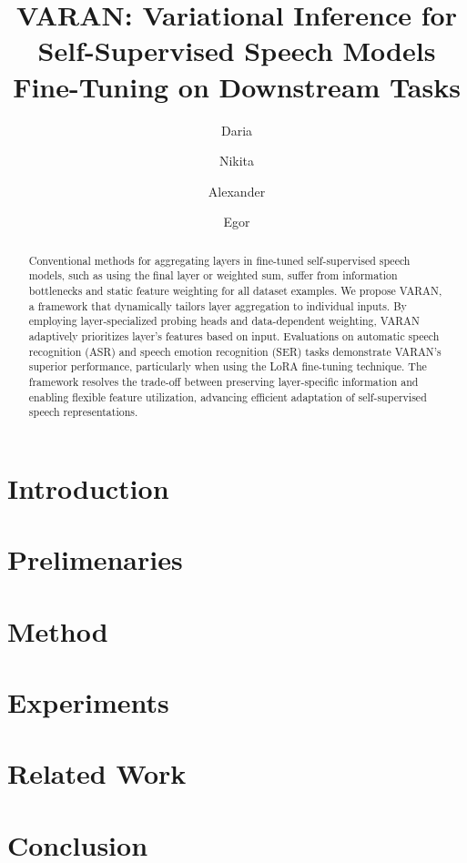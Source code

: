 \documentclass{Interspeech}
\title{VARAN: Variational Inference for Self-Supervised Speech Models Fine-Tuning on Downstream Tasks}
\author[affiliation={1}]{Daria}{Diatlova}
\author[affiliation={2}]{Nikita}{Balagansky}
\author[affiliation={1}]{Alexander}{Varlamov}
\author[affiliation={1}]{Egor}{Spirin}
\affiliation{}{VK Lab}{Russia}
\affiliation{}{T-Tech}{Russia}
\begin{document}
\maketitle

\begin{abstract}
    
    Conventional methods for aggregating layers in fine-tuned self-supervised speech models, such as using the final layer or weighted sum, suffer from information bottlenecks and static feature weighting for all dataset examples. We propose VARAN, a framework that dynamically tailors layer aggregation to individual inputs. By employing layer-specialized probing heads and data-dependent weighting, VARAN adaptively prioritizes layer's features based on input. Evaluations on automatic speech recognition (ASR) and speech emotion recognition (SER) tasks demonstrate VARAN’s superior performance, particularly when using the LoRA fine-tuning technique. The framework resolves the trade-off between preserving layer-specific information and enabling flexible feature utilization, advancing efficient adaptation of self-supervised speech representations.
\end{abstract}

\section{Introduction}


\section{Prelimenaries}


\section{Method}\label{sec:method}


\section{Experiments}


\section{Related Work}


\section{Conclusion}






\end{document}
